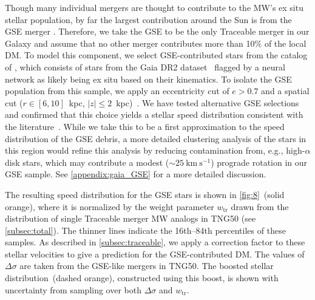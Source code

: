 \documentclass[twocolumn,tighten,twocolappendix]{aastex701}
\newcommand{\ftr}{\ensuremath{w_\mathrm{tr}}}
\newcommand{\kms}{\ensuremath{\text{km}~\text{s}^{-1}}}
\newcommand{\osim}{\mathord{\sim}}
\begin{document}
Though many individual mergers are thought to contribute to the MW's ex situ stellar population, by far the largest contribution around the Sun is from the GSE merger \citep{2018Natur.563...85H,2018ApJ...856L..26M, 2020ApJ...901...48N}. Therefore, we take the GSE to be the only Traceable merger in our Galaxy and assume that no other merger contributes more than 10\% of the local DM. To model this component, we select GSE-contributed stars from the catalog of \citet{2020A&A...636A..75O}, which consists of stars from the Gaia DR2 dataset~\citep{2018A&A...616A...1G} flagged by a neural network as likely being ex situ based on their kinematics. 
To isolate the GSE population from this sample, we apply an eccentricity cut of $e>0.7$ and a spatial cut ($r \in [6,10]$~kpc, $|z|\leq 2$~kpc)~\citep{2020ApJ...901...48N}. 
We have tested alternative GSE selections and confirmed that this choice yields a stellar speed distribution consistent with the literature~\citep{2019PhRvD..99b3012E,2019ApJ...874....3N,2019MNRAS.486..378L,2020ApJ...903...25N,2020PhRvD.101b3006O,2024ApJ...974..167Z}. While we take this to be a first approximation to the speed distribution of the GSE debris, a more detailed clustering analysis of the \citet{2020A&A...636A..75O} stars in this region would refine this analysis by reducing contamination from, e.g., high-$\alpha$ disk stars, which may contribute a modest ($\osim 25~\kms$) prograde rotation in our GSE sample. See \autoref{appendix:gaia_GSE} for a more detailed discussion.

The resulting speed distribution for the GSE stars is shown in \autoref{fig:8}~(solid orange), where it is normalized by the weight parameter \ftr{} drawn from the distribution of single Traceable merger MW analogs in TNG50 (see \autoref{subsec:total}). The thinner lines indicate the 16th--84th percentiles of these samples. As described in \autoref{subsec:traceable}, we apply a correction factor to these stellar velocities to give a prediction for the GSE-contributed DM. The values of $\Delta\sigma$ are taken from the GSE-like mergers in TNG50. The boosted stellar distribution~(dashed orange), constructed using this boost, is shown with uncertainty from sampling over both $\Delta\sigma$ and \ftr{}.
\end{document}
